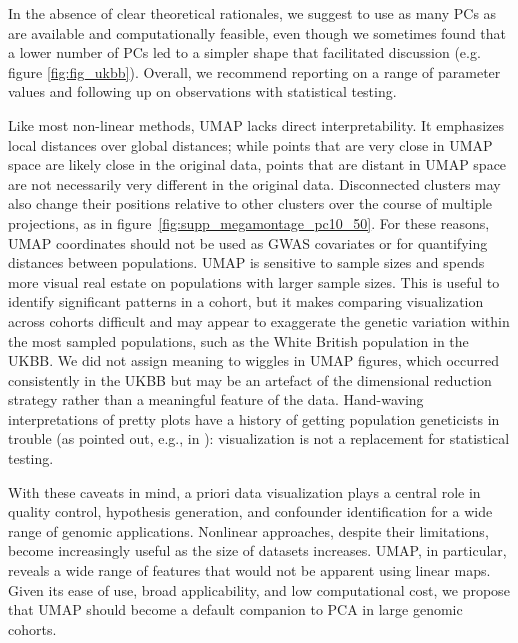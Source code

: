 \documentclass[12pt]{pnas-new}
\begin{document}
In the absence of clear theoretical rationales, we suggest to use as many PCs as are available and computationally feasible, even though we sometimes found that a lower number of PCs led to a simpler shape that facilitated discussion (e.g. figure \ref{fig:fig_ukbb}). Overall, we recommend reporting on a range of parameter values and following up on observations with statistical testing. 

Like most non-linear methods, UMAP lacks direct interpretability. It emphasizes local distances over global distances; while points that are very close in UMAP space are likely close in the original data, points that are distant in UMAP space are not necessarily very different in the original data. Disconnected clusters may also change their positions relative to other clusters over the course of multiple projections, as in figure~\ref{fig:supp_megamontage_pc10_50}. For these reasons, UMAP coordinates should not be used as GWAS covariates or for quantifying distances between populations. UMAP is sensitive to sample sizes and spends more visual real estate on populations with larger sample sizes. This is useful to identify significant patterns in a cohort, but it makes comparing visualization across cohorts difficult and may appear to exaggerate the genetic variation within the most sampled populations, such as the White British population in the UKBB. We did not assign meaning to wiggles in UMAP figures, which occurred consistently in the UKBB but may be an artefact of the dimensional reduction strategy rather than a meaningful feature of the data. Hand-waving interpretations of pretty plots have a history of getting population geneticists in trouble (as pointed out, e.g., in \cite{novembre2008interpreting}): visualization is not a replacement for statistical testing.

With these caveats in mind, a priori data visualization plays a central role in quality control, hypothesis generation, and confounder identification for a wide range of genomic applications. Nonlinear approaches, despite their limitations, become increasingly useful as the size of datasets increases. UMAP, in particular, reveals a wide range of features that would not be apparent using linear maps. Given its ease of use, broad applicability, and low computational cost, we propose that UMAP should become a default companion to PCA in large genomic cohorts.
\end{document}
